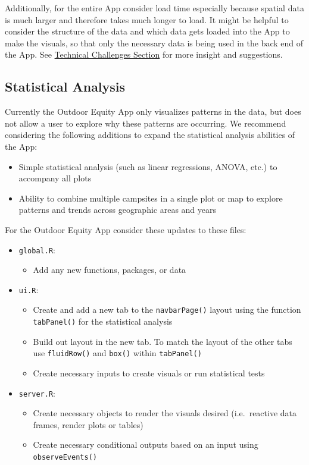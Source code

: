\documentclass[
  11 pt,
  openany]{book}
\providecommand{\tightlist}{%
  \setlength{\itemsep}{0pt}\setlength{\parskip}{0pt}}
\begin{document}
Additionally, for the entire App consider load time especially because spatial data is much larger and therefore takes much longer to load. It might be helpful to consider the structure of the data and which data gets loaded into the App to make the visuals, so that only the necessary data is being used in the back end of the App. See \protect\hyperlink{technical-challenges}{Technical Challenges Section} for more insight and suggestions.

\hypertarget{statistical-analysis}{%
\subsection{Statistical Analysis}\label{statistical-analysis}}

Currently the Outdoor Equity App only visualizes patterns in the data, but does not allow a user to explore why these patterns are occurring. We recommend considering the following additions to expand the statistical analysis abilities of the App:

\begin{itemize}
\tightlist
\item
  Simple statistical analysis (such as linear regressions, ANOVA, etc.) to accompany all plots
\item
  Ability to combine multiple campsites in a single plot or map to explore patterns and trends across geographic areas and years
\end{itemize}

For the Outdoor Equity App consider these updates to these files:

\begin{itemize}
\item
  \texttt{global.R}:

  \begin{itemize}
  \tightlist
  \item
    Add any new functions, packages, or data
  \end{itemize}
\item
  \texttt{ui.R}:

  \begin{itemize}
  \tightlist
  \item
    Create and add a new tab to the \texttt{navbarPage()} layout using the function \texttt{tabPanel()} for the statistical analysis
  \item
    Build out layout in the new tab. To match the layout of the other tabs use \texttt{fluidRow()} and \texttt{box()} within \texttt{tabPanel()}
  \item
    Create necessary inputs to create visuals or run statistical tests
  \end{itemize}
\item
  \texttt{server.R}:

  \begin{itemize}
  \tightlist
  \item
    Create necessary objects to render the visuals desired (i.e.~reactive data frames, render plots or tables)
  \item
    Create necessary conditional outputs based on an input using \texttt{observeEvents()}
  \end{itemize}
\end{itemize}
\end{document}
